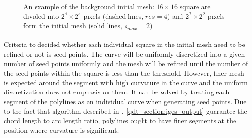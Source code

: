 \begin{figure}[!ht]
    \centering
    \caption{An example of the background initial mesh: $16 \times 16$ square are divided into $2^4 \times 2^4$ pixels (dashed lines, $res=4$) and $2^2 \times 2^2$ pixels form the initial mesh (solid lines, $s_{max}=2$)}
    \label{qdt_fig:qdt_initial_mesh}
\end{figure}

\paragraph{}
Criteria to decided whether each individual square in the initial mesh need to be refined or not is seed points.
The curve will be uniformly discretized into a given number of seed points uniformly and the mesh will be refined until the number of the seed points within the square is less than the threshold.
However, finer mesh is expected around the segment with high curvature in the curve and the uniform discretization does not emphasis on them.
It can be solved by treating each segment of the polylines as an individual curve when generating seed points.
Due to the fact that algorithm described in .~\ref{qdt_section:iges_output} guarantee the chord length to arc length ratio, polylines ought to have finer segments at the position where curvature is significant.

